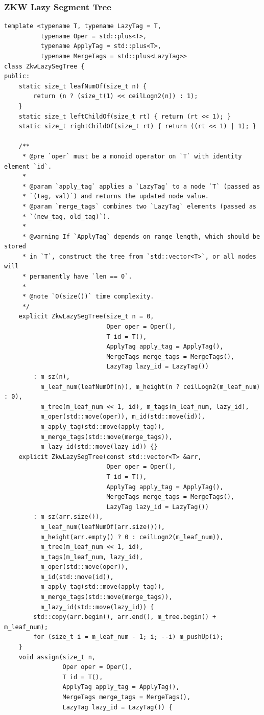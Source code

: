 \documentclass[UTF8]{article}
\begin{document}
\subsubsection{ZKW Lazy Segment Tree}
\begin{verbatim}
template <typename T, typename LazyTag = T,
		  typename Oper = std::plus<T>,
		  typename ApplyTag = std::plus<T>,
		  typename MergeTags = std::plus<LazyTag>>
class ZkwLazySegTree {
public:
	static size_t leafNumOf(size_t n) {
		return (n ? (size_t(1) << ceilLogn2(n)) : 1);
	}
	static size_t leftChildOf(size_t rt) { return (rt << 1); }
	static size_t rightChildOf(size_t rt) { return ((rt << 1) | 1); }

	/**
	 * @pre `oper` must be a monoid operator on `T` with identity element `id`.
	 *
	 * @param `apply_tag` applies a `LazyTag` to a node `T` (passed as
	 * `(tag, val)`) and returns the updated node value.
	 * @param `merge_tags` combines two `LazyTag` elements (passed as
	 * `(new_tag, old_tag)`).
	 *
	 * @warning If `ApplyTag` depends on range length, which should be stored
	 * in `T`, construct the tree from `std::vector<T>`, or all nodes will
	 * permanently have `len == 0`.
	 *
	 * @note `O(size())` time complexity.
	 */
	explicit ZkwLazySegTree(size_t n = 0,
							Oper oper = Oper(),
							T id = T(),
							ApplyTag apply_tag = ApplyTag(),
							MergeTags merge_tags = MergeTags(),
							LazyTag lazy_id = LazyTag())
		: m_sz(n),
		  m_leaf_num(leafNumOf(n)), m_height(n ? ceilLogn2(m_leaf_num) : 0),
		  m_tree(m_leaf_num << 1, id), m_tags(m_leaf_num, lazy_id),
		  m_oper(std::move(oper)), m_id(std::move(id)),
		  m_apply_tag(std::move(apply_tag)),
		  m_merge_tags(std::move(merge_tags)),
		  m_lazy_id(std::move(lazy_id)) {}
	explicit ZkwLazySegTree(const std::vector<T> &arr,
							Oper oper = Oper(),
							T id = T(),
							ApplyTag apply_tag = ApplyTag(),
							MergeTags merge_tags = MergeTags(),
							LazyTag lazy_id = LazyTag())
		: m_sz(arr.size()),
		  m_leaf_num(leafNumOf(arr.size())),
		  m_height(arr.empty() ? 0 : ceilLogn2(m_leaf_num)),
		  m_tree(m_leaf_num << 1, id),
		  m_tags(m_leaf_num, lazy_id),
		  m_oper(std::move(oper)),
		  m_id(std::move(id)),
		  m_apply_tag(std::move(apply_tag)),
		  m_merge_tags(std::move(merge_tags)),
		  m_lazy_id(std::move(lazy_id)) {
		std::copy(arr.begin(), arr.end(), m_tree.begin() + m_leaf_num);
		for (size_t i = m_leaf_num - 1; i; --i) m_pushUp(i);
	}
	void assign(size_t n,
				Oper oper = Oper(),
				T id = T(),
				ApplyTag apply_tag = ApplyTag(),
				MergeTags merge_tags = MergeTags(),
				LazyTag lazy_id = LazyTag()) {

\end{verbatim}
\end{document}
